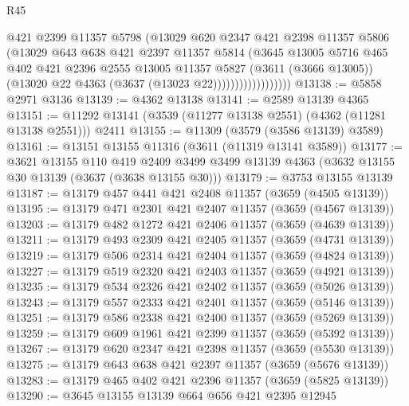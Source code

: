 \begin{lexlean}{R45}
\begin{coremodule}
                            @421
                            @2399
                            @11357
                            @5798
                            (@13029
                              @620
                              @2347
                              @421
                              @2398
                              @11357
                              @5806
                              (@13029
                                @643
                                @638
                                @421
                                @2397
                                @11357
                                @5814
                                (@3645
                                  @13005
                                  @5716
                                  @465
                                  @402
                                  @421
                                  @2396
                                  @2555
                                  @13005
                                  @11357
                                  @5827
                                  (@3611 (@3666 @13005))
                                  (@13020 @22 @4363 (@3637 (@13023 @22))))))))))))))))))
@13138 := @5858 @2971 @3136
@13139 := @4362 @13138
@13141 := @2589 @13139 @4365
@13151 := @11292 @13141 (@3539 (@11277 @13138 @2551) (@4362 (@11281 @13138 @2551))) @2411
@13155 := @11309 (@3579 (@3586 @13139) @3589)
@13161 := @13151 @13155 @11316 (@3611 (@11319 @13141 @3589))
@13177 := @3621
    @13155
    @110
    @419
    @2409
    @3499
    @3499
    @13139
    @4363
    (@3632 @13155 @30 @13139 (@3637 (@3638 @13155 @30)))
@13179 := @3753 @13155 @13139
@13187 := @13179 @457 @441 @421 @2408 @11357 (@3659 (@4505 @13139))
@13195 := @13179 @471 @2301 @421 @2407 @11357 (@3659 (@4567 @13139))
@13203 := @13179 @482 @1272 @421 @2406 @11357 (@3659 (@4639 @13139))
@13211 := @13179 @493 @2309 @421 @2405 @11357 (@3659 (@4731 @13139))
@13219 := @13179 @506 @2314 @421 @2404 @11357 (@3659 (@4824 @13139))
@13227 := @13179 @519 @2320 @421 @2403 @11357 (@3659 (@4921 @13139))
@13235 := @13179 @534 @2326 @421 @2402 @11357 (@3659 (@5026 @13139))
@13243 := @13179 @557 @2333 @421 @2401 @11357 (@3659 (@5146 @13139))
@13251 := @13179 @586 @2338 @421 @2400 @11357 (@3659 (@5269 @13139))
@13259 := @13179 @609 @1961 @421 @2399 @11357 (@3659 (@5392 @13139))
@13267 := @13179 @620 @2347 @421 @2398 @11357 (@3659 (@5530 @13139))
@13275 := @13179 @643 @638 @421 @2397 @11357 (@3659 (@5676 @13139))
@13283 := @13179 @465 @402 @421 @2396 @11357 (@3659 (@5825 @13139))
@13290 := @3645 @13155 @13139 @664 @656 @421 @2395 @12945

\end{coremodule}
\end{lexlean}
